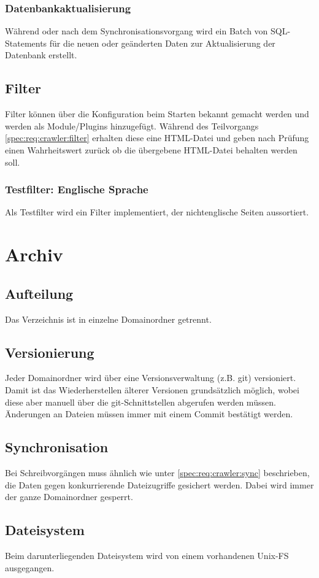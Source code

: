 	\subsubsection{Datenbankaktualisierung}
		Während oder nach dem Synchronisationsvorgang wird ein Batch von SQL-Statements für die neuen oder geänderten Daten
		zur Aktualisierung der Datenbank erstellt.
\subsection{Filter}
	Filter können über die Konfiguration beim Starten bekannt gemacht werden und werden als Module/Plugins hinzugefügt.
	Während des Teilvorgangs \ref{spec:req:crawler:filter} erhalten diese eine HTML-Datei und geben nach Prüfung einen Wahrheitswert zurück
	ob die übergebene HTML-Datei behalten werden soll.
	\subsubsection{Testfilter: Englische Sprache}
		Als Testfilter wird ein Filter implementiert, der nichtenglische Seiten aussortiert.


\section{Archiv} \label{spec:req:archive}
\subsection{Aufteilung}\label{spec:req:archive:dist}
	Das Verzeichnis ist in einzelne Domainordner getrennt. 
\subsection{Versionierung}\label{spec:req:archive:vers}
	Jeder Domainordner wird über eine Versionsverwaltung (z.B. git) versioniert. 
	Damit ist das Wiederherstellen älterer Versionen grundsätzlich möglich,
	wobei diese aber manuell über die git-Schnittstellen abgerufen werden müssen.
	Änderungen an Dateien müssen immer mit einem Commit bestätigt werden.
\subsection{Synchronisation}\label{spec:req:archive:sync}
	Bei Schreibvorgängen muss ähnlich wie unter \ref{spec:req:crawler:sync} beschrieben, 
	die Daten gegen konkurrierende Dateizugriffe gesichert werden.
	Dabei wird immer der ganze Domainordner gesperrt.
\subsection{Dateisystem} \label{spec:req:archive:fs}
	Beim darunterliegenden Dateisystem wird von einem vorhandenen Unix-FS ausgegangen.
